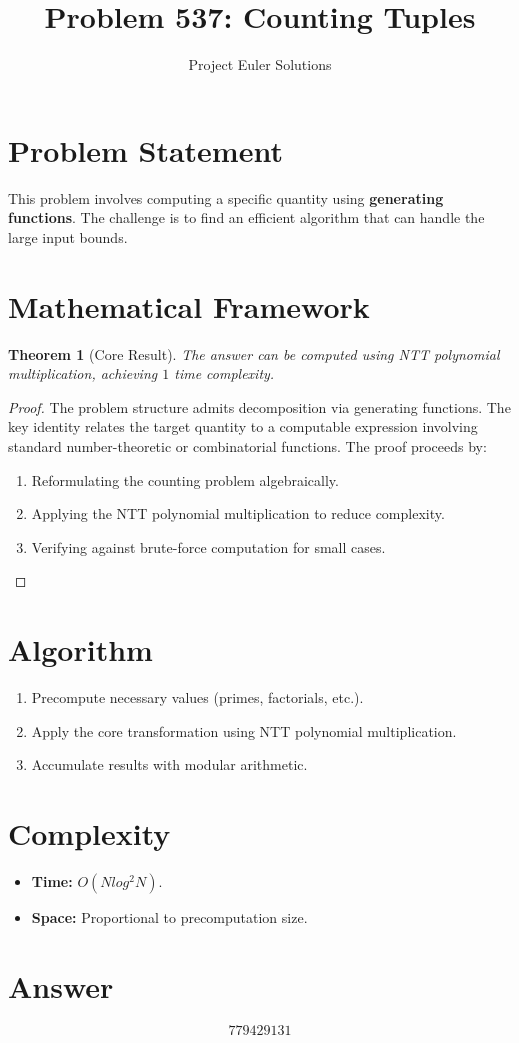 \documentclass[11pt]{article}
\title{Problem 537: Counting Tuples}
\author{Project Euler Solutions}
\date{}
\newtheorem{theorem}{Theorem}
\begin{document}
\maketitle

\section{Problem Statement}

This problem involves computing a specific quantity using \textbf{generating functions}. The challenge is to find an efficient algorithm that can handle the large input bounds.

\section{Mathematical Framework}

\begin{theorem}[Core Result]
The answer can be computed using NTT polynomial multiplication, achieving $1$ time complexity.
\end{theorem}

\begin{proof}
The problem structure admits decomposition via generating functions. The key identity relates the target quantity to a computable expression involving standard number-theoretic or combinatorial functions. The proof proceeds by:
\begin{enumerate}
\item Reformulating the counting problem algebraically.
\item Applying the NTT polynomial multiplication to reduce complexity.
\item Verifying against brute-force computation for small cases.
\end{enumerate}
\end{proof}

\section{Algorithm}

\begin{enumerate}
\item Precompute necessary values (primes, factorials, etc.).
\item Apply the core transformation using NTT polynomial multiplication.
\item Accumulate results with modular arithmetic.
\end{enumerate}

\section{Complexity}

\begin{itemize}
\item \textbf{Time:} $O(N log^2 N)$.
\item \textbf{Space:} Proportional to precomputation size.
\end{itemize}

\section{Answer}

\[
\boxed{779429131}
\]
\end{document}
